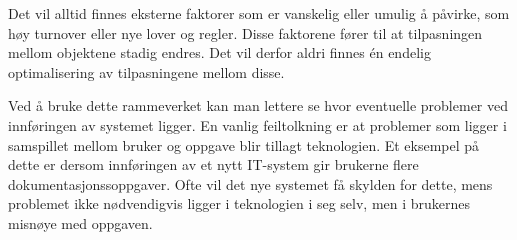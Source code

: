 \noindent
Det vil alltid finnes eksterne faktorer som er vanskelig eller umulig å påvirke, som høy turnover eller nye lover og regler. Disse faktorene fører til at tilpasningen mellom objektene stadig endres. Det vil derfor aldri finnes én endelig optimalisering av tilpasningene mellom disse. 

\noindent
Ved å bruke dette rammeverket kan man lettere se hvor eventuelle problemer ved innføringen av systemet ligger. En vanlig feiltolkning er at problemer som ligger i samspillet mellom bruker og oppgave blir tillagt teknologien. Et eksempel på dette er dersom innføringen av et nytt IT-system gir brukerne flere dokumentasjonssoppgaver. Ofte vil det nye systemet få skylden for dette, mens problemet ikke nødvendigvis ligger i teknologien i seg selv, men i brukernes misnøye med oppgaven.

